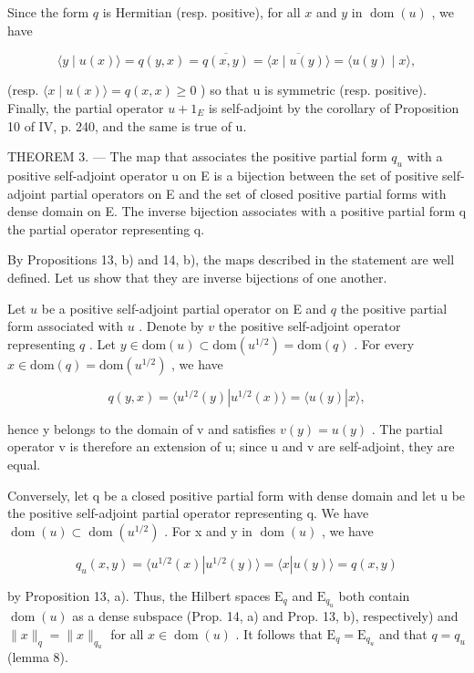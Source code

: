 Since the form \(q\) is Hermitian (resp. positive), for all \(x\) and \(y\) in \(\operatorname{dom}(u)\) , we have

\[
\langle y \mid u (x) \rangle = q (y, x) = \overline {{q (x , y)}} = \overline {{\langle x \mid u (y) \rangle}} = \langle u (y) \mid x \rangle ,
\]

(resp. \(\langle x \mid u(x) \rangle = q(x, x) \geqslant 0\) ) so that u is symmetric (resp. positive). Finally, the partial operator \(u + 1_{E}\) is self-adjoint by the corollary of Proposition 10 of IV, p. 240, and the same is true of u.

THEOREM 3. --- The map that associates the positive partial form \(q_u\) with a positive self-adjoint operator u on E is a bijection between the set of positive self-adjoint partial operators on E and the set of closed positive partial forms with dense domain on E. The inverse bijection associates with a positive partial form q the partial operator representing q.

By Propositions 13, b) and 14, b), the maps described in the statement are well defined. Let us show that they are inverse bijections of one another.

Let \(u\) be a positive self-adjoint partial operator on E and \(q\) the positive partial form associated with \(u\) . Denote by \(v\) the positive self-adjoint operator representing \(q\) . Let \(y \in \mathrm{dom}(u) \subset \mathrm{dom}(u^{1/2}) = \mathrm{dom}(q)\) . For every \(x \in \mathrm{dom}(q) = \mathrm{dom}(u^{1/2})\) , we have

\[
q (y, x) = \langle u ^ {1 / 2} (y) | u ^ {1 / 2} (x) \rangle = \langle u (y) | x \rangle ,
\]

hence y belongs to the domain of v and satisfies \(v(y) = u(y)\) . The partial operator v is therefore an extension of u; since u and v are self-adjoint, they are equal.

Conversely, let q be a closed positive partial form with dense domain and let u be the positive self-adjoint partial operator representing q. We have \(\operatorname{dom}(u) \subset \operatorname{dom}(u^{1/2})\) . For x and y in \(\operatorname{dom}(u)\) , we have

\[
q _ {u} (x, y) = \langle u ^ {1 / 2} (x) | u ^ {1 / 2} (y) \rangle = \langle x | u (y) \rangle = q (x, y)
\]

by Proposition 13, a). Thus, the Hilbert spaces \(\mathrm{E}_q\) and \(\mathrm{E}_{q_u}\) both contain \(\operatorname{dom}(u)\) as a dense subspace (Prop. 14, a) and Prop. 13, b), respectively) and \(\|x\|_q = \|x\|_{q_u}\) for all \(x \in \operatorname{dom}(u)\) . It follows that \(\mathrm{E}_q = \mathrm{E}_{q_u}\) and that \(q = q_u\) (lemma 8).

